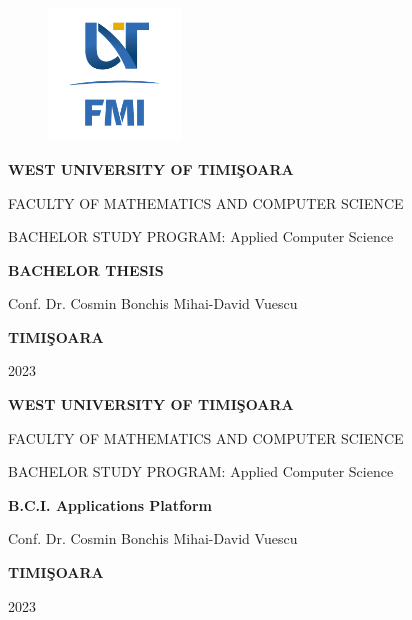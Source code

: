 \documentclass[12pt,a4paper]{book}
\theoremstyle{definition}
\theoremstyle{remark}
\begin{document}
\sloppy

\thispagestyle{empty}
\begin{center}
\begin{figure}[h!]
\vspace{-20pt}
\begin{center}
\includegraphics[width=100pt]{Graphics/FMI Logo.png}
\end{center}
\end{figure}


{\large{\bf WEST UNIVERSITY OF TIMI\c SOARA

FACULTY OF MATHEMATICS AND COMPUTER SCIENCE

BACHELOR STUDY PROGRAM:  Applied Computer Science}}

\vspace{120pt}
{\huge {\bf BACHELOR THESIS}}

\vspace{160pt}
\end{center}

{\large{}

\noindent Conf. Dr. Cosmin Bonchis \hfill 
\noindent  Mihai-David Vuescu
}

\vfill
\begin{center}
{\bf TIMI\c SOARA

2023}
\end{center}
\newpage
\thispagestyle{empty}
\begin{center}
{\large{\bf WEST UNIVERSITY OF TIMI\c SOARA
		
FACULTY OF MATHEMATICS AND COMPUTER SCIENCE
		
BACHELOR STUDY PROGRAM:  Applied Computer Science}}

\vspace{200pt}
{\huge {\bf B.C.I. Applications Platform }}

\vspace{153pt}
\end{center}

{\large{}

\noindent Conf. Dr. Cosmin Bonchis\hfill
\noindent Mihai-David Vuescu}
 

\vfill
\begin{center}
{\bf TIMI\c SOARA

2023}
\end{center}

\newpage
\normalsize{}


\tableofcontents




\end{document}
